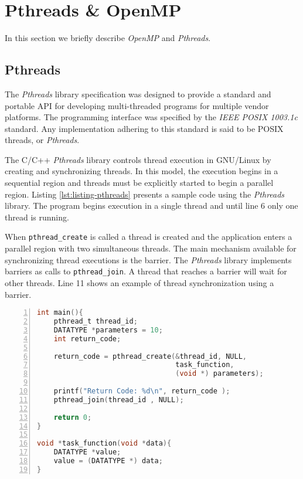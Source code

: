 \section{Pthreads \& OpenMP}
\label{sec:apis}

In this section we briefly describe \textit{OpenMP} and \textit{Pthreads}.

\subsection{Pthreads}

The \textit{Pthreads} library specification was designed to provide a standard
and portable API for developing multi-threaded programs for multiple vendor
platforms.  The programming interface was specified by the \textit{IEEE POSIX
1003.1c} standard. Any implementation adhering to this standard is said to be
POSIX threads, or \textit{Pthreads}.

The C/C++ \textit{Pthreads} library controls thread execution in GNU/Linux by
creating and synchronizing threads. In this model, the execution begins in a
sequential region and threads must be explicitly started to begin
a parallel region.
Listing \ref{lst:listing-pthreads} presents a sample code using the
\textit{Pthreads} library. The program begins execution in a
single thread and until line 6 only one thread is running.

When \texttt{pthread\_create} is called a thread is created and the application
enters a parallel region with two simultaneous threads.  The main mechanism
available for synchronizing thread executions is the barrier. The
\textit{Pthreads} library implements barriers as calls to
\texttt{pthread\_join}. A thread that reaches a barrier will wait for other
threads. Line 11 shows an example of thread synchronization using a barrier.

\begin{lstlisting}[language=C, basicstyle=\ttfamily\scriptsize, numbers=left,
                   frame=no, showspaces=false, showstringspaces=false,
                   caption={\textit{Pthreads} Sample Program}, captionpos=b,
                   numberstyle=\tiny,
                   xleftmargin=0.5cm,
                   label=lst:listing-pthreads, keywords={%
                       DATATYPE, pthread_t, pthread_create,
                       pthread_join, task_function, NULL, int, main,
                       void, printf, return%
                       },
                   otherkeywords={::, \#pragma, \#include, <<<,>>>, \&, \*, +, -, /, [, ], >, <}
                   ]
int main(){
    pthread_t thread_id;
    DATATYPE *parameters = 10;
    int return_code;

    return_code = pthread_create(&thread_id, NULL,
                                 task_function,
                                 (void *) parameters);

    printf("Return Code: %d\n", return_code );
    pthread_join(thread_id , NULL);

    return 0;
}

void *task_function(void *data){
    DATATYPE *value;
    value = (DATATYPE *) data;
}
\end{lstlisting}

